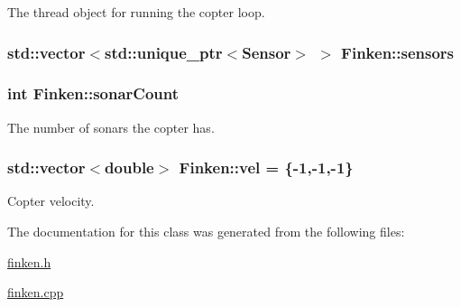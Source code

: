 The thread object for running the copter loop. 

\subsubsection[{\texorpdfstring{sensors}{sensors}}]{\setlength{\rightskip}{0pt plus 5cm}std\+::vector$<$std\+::unique\+\_\+ptr$<${\bf Sensor}$>$ $>$ Finken\+::sensors\hspace{0.3cm}{\ttfamily [private]}}\hypertarget{classFinken_a2e2cef18378a4e721dbcd8ddd511500c}{}\label{classFinken_a2e2cef18378a4e721dbcd8ddd511500c}
\subsubsection[{\texorpdfstring{sonar\+Count}{sonarCount}}]{\setlength{\rightskip}{0pt plus 5cm}int Finken\+::sonar\+Count}\hypertarget{classFinken_acca526b76c18d3bb890d3d8adef78cfa}{}\label{classFinken_acca526b76c18d3bb890d3d8adef78cfa}


The number of sonars the copter has. 

\subsubsection[{\texorpdfstring{vel}{vel}}]{\setlength{\rightskip}{0pt plus 5cm}std\+::vector$<$double$>$ Finken\+::vel = \{-\/1,-\/1,-\/1\}}\hypertarget{classFinken_a4dd260e6384e7cfb8040bd53fe1c2d62}{}\label{classFinken_a4dd260e6384e7cfb8040bd53fe1c2d62}


Copter velocity. 



The documentation for this class was generated from the following files\+:\begin{DoxyCompactItemize}
\item 
\hyperlink{finken_8h}{finken.\+h}\item 
\hyperlink{finken_8cpp}{finken.\+cpp}\end{DoxyCompactItemize}
